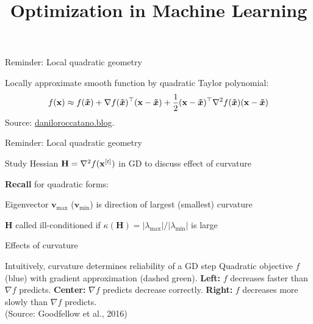 \documentclass[11pt,compress,t,notes=noshow, xcolor=table]{beamer}
\title{Optimization in Machine Learning}
\begin{document}

\begin{framei}{Reminder: Local quadratic geometry}
\item Locally approximate smooth function by quadratic Taylor polynomial:
$$f(\mathbf{x}) \approx f(\bm{\tilde{x}}) + \nabla f(\bm{\tilde{x}})^\top(\mathbf{x}-\bm{\tilde{x}}) +
\frac 12(\mathbf{x}-\bm{\tilde{x}})^\top\nabla^2 f(\bm{\tilde{x}})(\mathbf{x}-\bm{\tilde{x}})$$
\centering\footnotesize
 Source: \url{daniloroccatano.blog}.
\end{framei}

\begin{framei}{Reminder: Local quadratic geometry}
\item Study Hessian $\mathbf{H} = \nabla^2 f(\mathbf{x}^{[t]})$ in GD to discuss effect of curvature 
\item \textbf{Recall} for quadratic forms:
\begin{itemizeM}
\item Eigenvector $\textbf{v}_\text{max}$ ($\textbf{v}_\text{min}$) is direction of largest (smallest) curvature
\item $\mathbf{H}$ called ill-conditioned if $\kappa(\mathbf{H}) = |\lambda_\text{max}| / |\lambda_\text{min}|$ is large
\end{itemizeM}
\vfill
{}
\end{framei}

\begin{framei}{Effects of curvature}
\item Intuitively, curvature determines reliability of a GD step
\centering\small
Quadratic objective $f$ (blue) with gradient approximation (dashed green). \textbf{Left:} $f$ decreases faster than $\nabla f$ predicts. \textbf{Center:} $\nabla f$ predicts decrease correctly. \textbf{Right:} $f$ decreases more slowly than $\nabla f$ predicts.\\
(Source: Goodfellow et al., 2016)
\end{framei}
\end{document}
